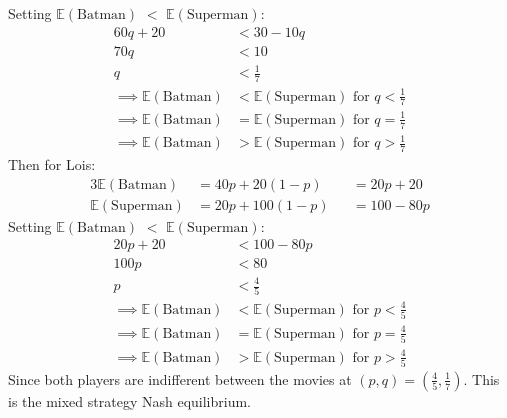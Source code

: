 \documentclass{article}
\newcommand{\tE}[1]{$\mathbb{E}(\mbox{#1})$}
\newcommand{\E}[1]{\mathbb{E}(\mbox{#1})}
\begin{document}
Setting \tE{Batman} $<$ \tE{Superman}:
\begin{align*}
    60q + 20 &< 30 - 10q\\
    70q &< 10\\
    q &< \frac{1}{7}\\
    \implies \E{Batman} &< \E{Superman} \mbox{ for } q < \frac{1}{7}\\
    \implies \E{Batman} &= \E{Superman} \mbox{ for } q = \frac{1}{7}\\
    \implies \E{Batman} &> \E{Superman} \mbox{ for } q > \frac{1}{7}
\end{align*}
Then for Lois:
\begin{alignat}{3}
    \E{Batman} &= 40p + 20(1-p) &&= 20p + 20\\
    \E{Superman} &= 20p + 100(1-p) &&= 100 - 80p
\end{alignat}
Setting \tE{Batman} $<$ \tE{Superman}:
\begin{align*}
    20p + 20 &< 100 - 80p\\
    100p &< 80\\
    p &< \frac{4}{5}\\
    \implies \E{Batman} &< \E{Superman} \mbox{ for } p < \frac{4}{5}\\
    \implies \E{Batman} &= \E{Superman} \mbox{ for } p = \frac{4}{5}\\
    \implies \E{Batman} &> \E{Superman} \mbox{ for } p > \frac{4}{5}
\end{align*}
Since both players are indifferent between the movies at $(p, q) = (\frac{4}{5}, \frac{1}{7})$. This is the mixed strategy Nash equilibrium.
\end{document}
